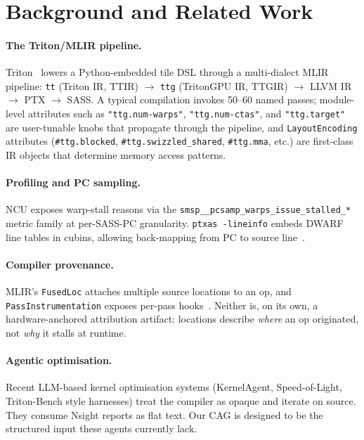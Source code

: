 \documentclass[10pt]{article}
\begin{document}
\section{Background and Related Work}

\paragraph{The Triton/MLIR pipeline.} Triton~\citep{tillet2019triton} lowers a Python-embedded tile DSL through a multi-dialect MLIR pipeline: \texttt{tt} (Triton IR, TTIR) $\to$ \texttt{ttg} (TritonGPU IR, TTGIR) $\to$ LLVM IR $\to$ PTX $\to$ SASS. A typical compilation invokes 50--60 named passes; module-level attributes such as \texttt{"ttg.num-warps"}, \texttt{"ttg.num-ctas"}, and \texttt{"ttg.target"} are user-tunable knobs that propagate through the pipeline, and \texttt{LayoutEncoding} attributes (\texttt{\#ttg.blocked}, \texttt{\#ttg.swizzled\_shared}, \texttt{\#ttg.mma}, etc.) are first-class IR objects that determine memory access patterns.

\paragraph{Profiling and PC sampling.} NCU exposes warp-stall reasons via the
\texttt{smsp\discretionary{}{}{}\_\_pcsamp\discretionary{}{}{}\_warps\discretionary{}{}{}\_issue\discretionary{}{}{}\_stalled\discretionary{}{}{}\_*} metric family at per-SASS-PC granularity. \texttt{ptxas -lineinfo} embeds DWARF line tables in cubins, allowing back-mapping from PC to source line~\citep{nsightdoc}.

\paragraph{Compiler provenance.} MLIR's \texttt{FusedLoc} attaches multiple source locations to an op, and \texttt{PassInstrumentation} exposes per-pass hooks~\citep{mlir2021}. Neither is, on its own, a hardware-anchored attribution artifact: locations describe \emph{where} an op originated, not \emph{why} it stalls at runtime.

\paragraph{Agentic optimisation.} Recent LLM-based kernel optimisation systems (KernelAgent, Speed-of-Light, Triton-Bench style harnesses) treat the compiler as opaque and iterate on source. They consume Nsight reports as flat text. Our CAG is designed to be the structured input these agents currently lack.
\end{document}
